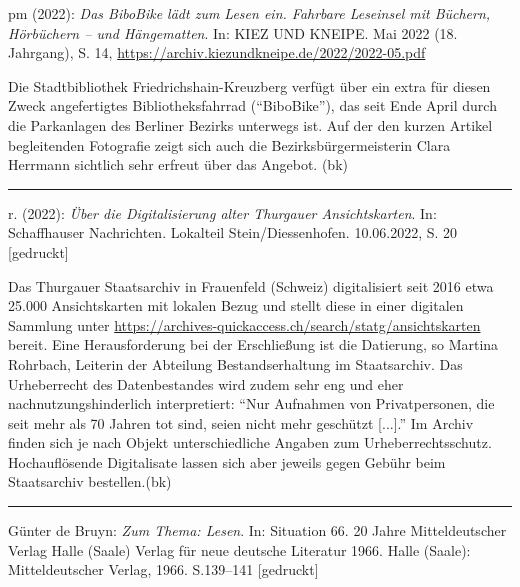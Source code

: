 \documentclass[a4paper,
fontsize=11pt,
oneside,
numbers=noperiodatend,
parskip=half-,
bibliography=totoc,
final
]{scrartcl}
\begin{document}
pm (2022): \emph{Das BiboBike lädt zum Lesen ein. Fahrbare Leseinsel mit
Büchern, Hörbüchern -- und Hängematten}. In: KIEZ UND KNEIPE. Mai 2022
(18. Jahrgang), S. 14,
\url{https://archiv.kiezundkneipe.de/2022/2022-05.pdf}

Die Stadtbibliothek Friedrichshain-Kreuzberg verfügt über ein extra für
diesen Zweck angefertigtes Bibliotheksfahrrad (\enquote{BiboBike}), das
seit Ende April durch die Parkanlagen des Berliner Bezirks unterwegs
ist. Auf der den kurzen Artikel begleitenden Fotografie zeigt sich auch
die Bezirksbürgermeisterin Clara Herrmann sichtlich sehr erfreut über
das Angebot. (bk)

\begin{center}\rule{0.5\linewidth}{0.5pt}\end{center}

r. (2022): \emph{Über die Digitalisierung alter Thurgauer
Ansichtskarten}. In: Schaffhauser Nachrichten. Lokalteil
Stein/Diessenhofen. 10.06.2022, S. 20 {[}gedruckt{]}

Das Thurgauer Staatsarchiv in Frauenfeld (Schweiz) digitalisiert seit
2016 etwa 25.000 Ansichtskarten mit lokalen Bezug und stellt diese in
einer digitalen Sammlung unter
\url{https://archives-quickaccess.ch/search/statg/ansichtskarten}
bereit. Eine Herausforderung bei der Erschließung ist die Datierung, so
Martina Rohrbach, Leiterin der Abteilung Bestandserhaltung im
Staatsarchiv. Das Urheberrecht des Datenbestandes wird zudem sehr eng
und eher nachnutzungshinderlich interpretiert: \enquote{Nur Aufnahmen
von Privatpersonen, die seit mehr als 70 Jahren tot sind, seien nicht
mehr geschützt {[}...{]}.} Im Archiv finden sich je nach Objekt
unterschiedliche Angaben zum Urheberrechtsschutz. Hochauflösende
Digitalisate lassen sich aber jeweils gegen Gebühr beim Staatsarchiv
bestellen.(bk)

\begin{center}\rule{0.5\linewidth}{0.5pt}\end{center}

Günter de Bruyn: \emph{Zum Thema: Lesen}. In: Situation 66. 20 Jahre
Mitteldeutscher Verlag Halle (Saale) Verlag für neue deutsche Literatur
1966. Halle (Saale): Mitteldeutscher Verlag, 1966. S.139--141
{[}gedruckt{]}
\end{document}
